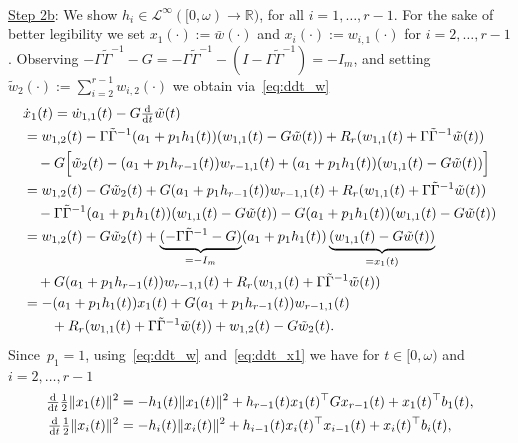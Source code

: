 \documentclass[ envcountsect, envcountsame]{svjour3}
\newcommand{\ddt}{\tfrac{\text{\normalfont d}}{\text{\normalfont d}t}}
\newcommand{\R}{\mathbb{R}}
\newcommand{\cL}{\mathcal{L}}
\begin{document}
\ \\
\underline{Step 2b}: 
We show $h_i \in \cL^\infty([0,\omega) \to \R)$, for all $i=1,\ldots,r-1$.
For the sake of better legibility we set $x_1(\cdot) := \bar w(\cdot)$ and $x_i(\cdot) := w_{i,1}(\cdot)$ for $i=2,\ldots,r-1$.
%
Observing $- \Gamma \tilde \Gamma^{-1} - G = -\Gamma \tilde \Gamma^{-1} - (I- \Gamma \tilde \Gamma^{-1}) = -I_m$, 
and setting $\tilde w_2(\cdot) := \sum_{i=2}^{r-1} w_{i,2}(\cdot)$ we obtain via~\eqref{eq:ddt_w} 
\begin{equation} \label{eq:ddt_x1}
\begin{aligned}
 & \dot x_1(t) = \dot w_{1,1}(t) - G \ddt \tilde w(t) \\
&=   w_{1,2}(t) - \Gamma \tilde \Gamma^{-1} ( a_1 + p_1 h_1(t)) (w_{1,1}(t) - G \tilde w(t)) + R_{r} (w_{1,1}(t) + \Gamma  \tilde \Gamma^{-1}\tilde w(t) ) \\
& \quad - G \Big[ \tilde w_{2}(t) - (a_1 + p_1 h_{r-1}(t))w_{r-1,1}(t) + (a_{1} + p_{1} h_{1}(t))(w_{1,1}(t)-G\tilde w(t))  \Big] \\
& =  w_{1,2}(t) - G \tilde w_2(t) + G(a_1 + p_1 h_{r-1}(t))w_{r-1,1}(t) + R_{r} (w_{1,1}(t) + \Gamma  \tilde \Gamma^{-1}\tilde w(t) ) \\
& \quad -  \Gamma \tilde \Gamma^{-1} ( a_1 + p_1 h_1(t)) (w_{1,1}(t) - G \tilde w(t)) - G ( a_1 + p_1 h_1(t)) (w_{1,1}(t) - G \tilde w(t)) \\
& =  w_{1,2}(t) - G \tilde w_2(t) + \underbrace{(-\Gamma \tilde \Gamma^{-1} - G)}_{= -I_m}( a_1 + p_1 h_1(t)) \underbrace{(w_{1,1}(t) - G \tilde w(t))}_{= x_1(t)}  \\
& \quad + G(a_1 + p_1 h_{r-1}(t))w_{r-1,1}(t) + R_{r} (w_{1,1}(t) + \Gamma  \tilde \Gamma^{-1}\tilde w(t) ) \\
& = - (a_1 + p_1 h_1(t)) x_1(t) + G(a_1 + p_1 h_{r-1}(t))w_{r-1,1}(t)\\
& \qquad + R_{r} (w_{1,1}(t) + \Gamma  \tilde \Gamma^{-1}\tilde w(t) ) +  w_{1,2}(t) - G \tilde w_2(t). 
\end{aligned}
\end{equation} 
%
Since~$p_1 =1$, using~\eqref{eq:ddt_w} and~\eqref{eq:ddt_x1} we have for $t \in [0,\omega)$ and $i=2,\ldots,r-1$
\begin{equation} \label{eq:ddt-w-bounded}
\begin{aligned}
\ddt \tfrac{1}{2} \| x_1(t)\|^2 &= -h_1(t) \| x_1(t)\|^2 + h_{r-1}(t) x_1(t)^\top G x_{r-1}(t) + x_1(t)^\top b_1(t), \\
\ddt \tfrac{1}{2} \| x_{i}(t)\|^2 &= -h_i(t) \| x_{i}(t)\|^2 + h_{i-1}(t) x_{i}(t)^\top x_{i-1}(t) + x_{i}(t)^\top b_i(t), %
\end{aligned}
\end{equation}
\end{document}
